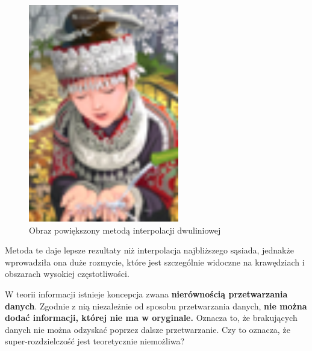 \begin{figure}[ht]
\begin{minipage}[t]{0.35\linewidth}
        \includegraphics[width=\linewidth]{Rozdziały/02.Podstawy_teoretyczne/comic_BILINEARx4.png}
        \caption{Obraz powiększony metodą interpolacji dwuliniowej}
        \label{fig:image10}
    \end{minipage}
\end{figure}


Metoda te daje lepsze rezultaty niż interpolacja najbliższego sąsiada, jednakże wprowadziła ona duże rozmycie, które jest szczególnie widoczne na krawędziach i obszarach wysokiej częstotliwości.


W teorii informacji istnieje koncepcja zwana \textbf{nierównością przetwarzania danych}. Zgodnie z nią niezależnie od sposobu przetwarzania danych, \textbf{nie można dodać informacji, której nie ma w oryginale.} Oznacza to, że brakujących danych nie można odzyskać poprzez dalsze przetwarzanie. Czy to oznacza, że super-rozdzielczość jest teoretycznie niemożliwa? 

